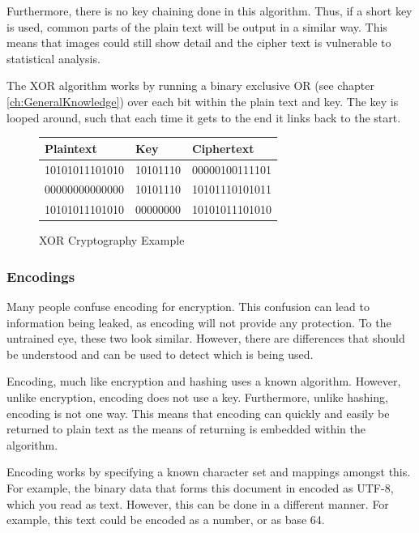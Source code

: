 \documentclass[a4paper,11pt]{report}
\begin{document}
				Furthermore, there is no key chaining done in this algorithm. 
				Thus, if a short key is used, common parts of the plain text will be output in a similar way. 
				This means that images could still show detail and the cipher text is vulnerable to statistical analysis. 

				The XOR algorithm works by running a binary exclusive OR (see chapter \ref{ch:GeneralKnowledge}) 
				over each bit within the plain text and key. 
				The key is looped around, such that each time it gets to the end it links back to the start. 

			\begin{figure}[htb]
				\centering
				\begin{tabular}{| l | l | l |}
					\hline
					\textbf{Plaintext} & \textbf{Key} & \textbf{Ciphertext} \\ \hline
					10101011101010 & 10101110 & 00000100111101 \\ \hline
					00000000000000 & 10101110 & 10101110101011 \\ \hline
					10101011101010 & 00000000 & 10101011101010 \\ \hline
				\end{tabular}
				\caption{XOR Cryptography Example}
				\label{fig:XORExample}
			\end{figure}
			\subsubsection{Encodings}
				Many people confuse encoding for encryption. 
				This confusion can lead to information being leaked, as encoding will not provide any protection. 
				To the untrained eye, these two look similar. 
				However, there are differences that should be understood and can be used to detect which is being used. 

				Encoding, much like encryption and hashing uses a known algorithm. 
				However, unlike encryption, encoding does not use a key. 
				Furthermore, unlike hashing, encoding is not one way. 
				This means that encoding can quickly and easily be returned to plain text as the means of returning is embedded within the algorithm.

				Encoding works by specifying a known character set and mappings amongst this. 
				For example, the binary data that forms this document in encoded as UTF-8, which you read as text. 
				However, this can be done in a different manner. 
				For example, this text could be encoded as a number, or as base 64. 
\end{document}
